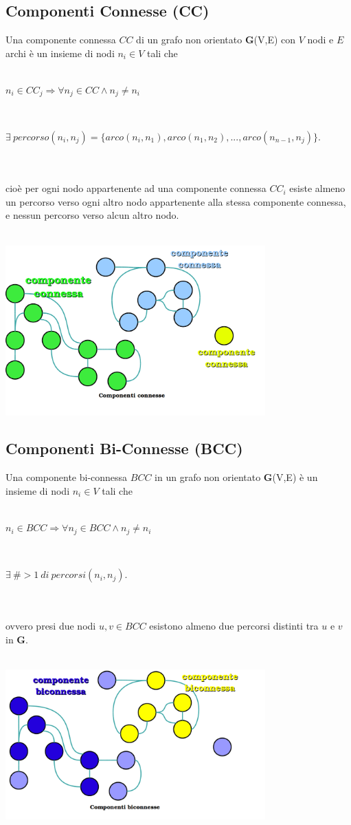 \documentclass[a4paper,11pt]{report}
\begin{document}
\subsection{Componenti Connesse (\textbf{CC})}
Una componente connessa $CC$ di un grafo non orientato \textbf{G}(V,E) con $V$ nodi e $E$ archi è un insieme di nodi $n_i \in V $ tali che
\\\\
\centerline{$n_i \in CC_j \Longrightarrow
 \forall n_j \in CC \wedge n_j \neq n_i \ $}\\\centerline{$ \exists\  percorso(n_i,n_j) = \{
 arco\left(n_i,n_1\right),arco\left(n_1,n_2\right),...,arco\left(n_{n-1},n_j\right) \}.$}
\\\\
cioè per ogni nodo appartenente ad una componente connessa $CC_i$ esiste almeno un percorso verso ogni altro nodo 
appartenente alla stessa componente connessa, e nessun percorso verso alcun altro nodo.
\\\\
\centerline{\includegraphics[width=100mm]{images/componenti_connesse_notit.png}} 
\subsection{Componenti Bi-Connesse (\textbf{BCC})}\label{Componenti Bi-Connesse}
Una componente bi-connessa $BCC$ in un grafo non orientato \textbf{G}(V,E) è un insieme di nodi $n_i \in V $ tali che \\\\
\centerline{$n_i \in BCC \Longrightarrow \forall n_j \in BCC \wedge n_j \neq n_i $}\\\centerline{$ \exists\ \# > 1\ di\ percorsi(n_i,n_j)
.$}
\\\\
ovvero presi due nodi $u,v\in BCC$ esistono almeno due percorsi distinti tra $u$ e $v$ in \textbf{G}.\\\\
\centerline{\includegraphics[width=100mm]{images/componenti_biconnesse_notit.png}}
\end{document}
